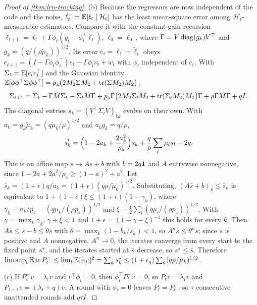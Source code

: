 \begin{proof}[Proof of \cref{thm:lrn-tracking}]
(b) Because the regressors are now independent of the code and the noise, $\hat\ell^-_t=\mathbb{E}[\ell_t\mid\mathcal H_t]$ has the least mean-square error among $\mathcal H_t$-measurable estimators. Compare it with the constant-gain recursion $\tilde\ell_{t+1}=\tilde\ell_t+\Gamma\phi_t(y_t-\phi_t^\top\tilde\ell_t)$, $\tilde\ell_0=\hat\ell^-_0$, where $\Gamma=V\operatorname{diag}(g_k)V^\top$ and $g_k=(q/(\rho\tilde\mu_k))^{1/2}$. Its error $e_t=\ell_t-\tilde\ell_t$ obeys $e_{t+1}=(I-\Gamma\phi_t\phi_t^\top)e_t-\Gamma\phi_t\nu_t+w_t$ with $\phi_t$ independent of $e_t$. With $\Sigma_t=\mathbb{E}[e_te_t^\top]$ and the Gaussian identity $\mathbb{E}[\phi\phi^\top\Sigma\phi\phi^\top]=p_{\mathrm a}\bigl(2M_2\Sigma M_2+\operatorname{tr}(\Sigma M_2)M_2\bigr)$,
\begin{equation}\label{eq:lrn-lms-cov}
\Sigma_{t+1}=\Sigma_t-\Gamma\tilde M\Sigma_t-\Sigma_t\tilde M\Gamma+p_{\mathrm a}\Gamma\bigl(2M_2\Sigma_tM_2+\operatorname{tr}(\Sigma_tM_2)M_2\bigr)\Gamma+\rho\Gamma\tilde M\Gamma+qI.
\end{equation}
The diagonal entries $s_k=(V^\top\Sigma_tV)_{kk}$ evolve on their own. With $a_k=g_k\tilde\mu_k=(q\tilde\mu_k/\rho)^{1/2}$ and $a_kg_k=q/\rho$,
\begin{equation}\label{eq:lrn-lms-diag}
s_k'=\Bigl(1-2a_k+\frac{2a_k^2}{p_{\mathrm a}}\Bigr)s_k+\frac q\rho\sum_l\mu_ls_l+2q.
\end{equation}
This is an affine map $s\mapsto As+b$ with $b=2q\mathbf{1}$ and $A$ entrywise nonnegative, since $1-2a+2a^2/p_{\mathrm a}\ge(1-a)^2+a^2$. Let $\bar s_k=(1+\epsilon)q/a_k=(1+\epsilon)(q\rho/\tilde\mu_k)^{1/2}$. Substituting, $(A\bar s+b)_k\le\bar s_k$ is equivalent to $1+(1+\epsilon)\xi\le(1+\epsilon)(1-\gamma_k)$, where $\gamma_k=a_k/p_{\mathrm a}=(q\mu_k/(\rho p_{\mathrm a}))^{1/2}$ and $\xi=\tfrac12\sum_l(q\mu_l/(\rho p_{\mathrm a}))^{1/2}$. With $\gamma=\max_k\gamma_k$, $\gamma+\xi<1$ and $1+\epsilon=(1-\gamma-\xi)^{-1}$ this holds for every $k$. Then $A\bar s\le\bar s-b\le\theta\bar s$ with $\theta=\max_k(1-b_k/\bar s_k)<1$, so $A^n\bar s\le\theta^n\bar s$; since $\bar s$ is positive and $A$ nonnegative, $A^n\to0$, the iterates converge from every start to the fixed point $s^\star$, and the iterates started at $\bar s$ decrease, so $s^\star\le\bar s$. Therefore $\limsup_t\mathbb{E}\operatorname{tr} P^-_t\le\lim_t\mathbb{E}\Vert e_t\Vert^2=\sum_ks^\star_k\le(1+\epsilon_q)\sum_k(q\rho/\tilde\mu_k)^{1/2}$.

(c) If $P^-_tv=\lambda_tv$ and $v^\top\phi_t=0$, then $\phi_t^\top P^-_tv=0$, so $P_tv=\lambda_tv$ and $P^-_{t+1}v=(\lambda_t+q)v$. A round with $\phi_t=0$ leaves $P_t=P^-_t$, so $\tau$ consecutive unattended rounds add $q\tau I$.
\end{proof}

